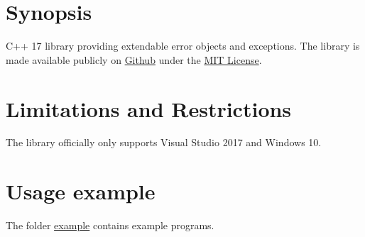 \documentclass[oneside]{article}
\begin{document}
\lstset{language=C++,
  basicstyle=\footnotesize, %
  showstringspaces=false    %
}
\maketitle
\tableofcontents
\section{Synopsis}
C++ 17 library providing extendable error objects and exceptions.
The library is made available publicly on
\href{\GetLibraryRepository}{Github}
under the
\href{\GetLibraryRepository/blob/master/LICENSE}{MIT License}.

\section{Limitations and Restrictions}
The library officially only supports Visual Studio 2017 and Windows 10.

\section{Usage example}
The folder \href{\GetLibraryRepository/blob/master/example}{example} contains example programs.
\end{document}
